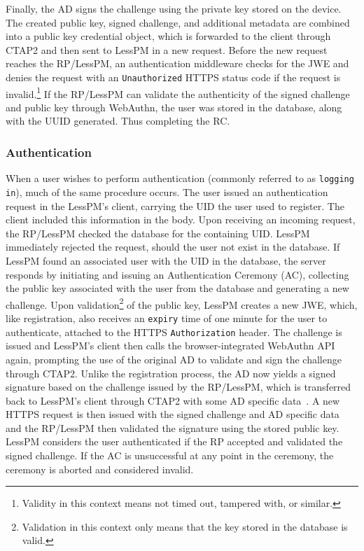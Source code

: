 Finally, the AD signs the challenge using the private key stored on the
device.
The created public key, signed challenge, and additional metadata are combined
into a public key credential object, which is forwarded to the client
through CTAP2 and then sent to LessPM in a new request.
Before the new request reaches the RP/LessPM, an authentication middleware
checks for the JWE and denies the request with an \texttt{Unauthorized} HTTPS
status code if the request is invalid.\footnote{
  Validity in this context means not timed out, tampered with, or similar.
}
If the RP/LessPM can validate the authenticity of the signed challenge and
public key through WebAuthn, the user was stored in the database, along with the
UUID generated.
Thus completing the RC\@.

\subsubsection{Authentication}\label{subsubsec:metho-authentication}
When a user wishes to perform authentication (commonly referred to as
\texttt{logging in}), much of the same procedure occurs.
The user issued an authentication request in the LessPM's client, carrying
the UID the user used to register.
The client included this information in the body.
Upon receiving an incoming request, the RP/LessPM checked the database for
the containing UID\@.
LessPM immediately rejected the request, should the user not exist in the
database.
If LessPM found an associated user with the UID in the database, the server
responds by initiating and issuing an Authentication Ceremony (AC),
collecting the public key associated with the user from the database and
generating a new challenge.
Upon validation\footnote{
  Validation in this context only means that the key stored in the database
  is valid.
} of the public key, LessPM creates a new JWE, which, like registration, also
receives an \texttt{expiry} time of one minute for the user to authenticate,
attached to the HTTPS \texttt{Authorization} header.
The challenge is issued and LessPM's client then calls the
browser-integrated WebAuthn API again, prompting the use of the original AD
to validate and sign the challenge through CTAP2.
Unlike the registration process, the AD now yields a signed signature based
on the challenge issued by the RP/LessPM\@, which is transferred back to
LessPM's client through CTAP2 with some AD specific
data~\cite{webauthn_authenticator_data}.
A new HTTPS request is then issued with the signed challenge and AD specific
data and the RP/LessPM then validated the signature using the stored public
key.
LessPM considers the user authenticated if the RP accepted and validated the
signed challenge.
If the AC is unsuccessful at any point in the ceremony, the ceremony is
aborted and considered invalid.

